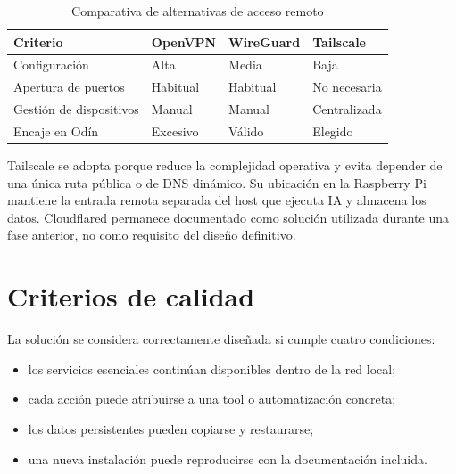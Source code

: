 \begin{table}[H]
  \centering
  \caption{Comparativa de alternativas de acceso remoto}
  \label{tab:vpn-comparativa}
  \begin{tabularx}{\textwidth}{lXXX}
    \toprule
    Criterio & OpenVPN & WireGuard & Tailscale \\
    \midrule
    Configuración & Alta & Media & Baja \\
    Apertura de puertos & Habitual & Habitual & No necesaria \\
    Gestión de dispositivos & Manual & Manual & Centralizada \\
    Encaje en Odín & Excesivo & Válido & Elegido \\
    \bottomrule
  \end{tabularx}
\end{table}

Tailscale se adopta porque reduce la complejidad operativa y evita depender de
una única ruta pública o de DNS dinámico. Su ubicación en la Raspberry Pi
mantiene la entrada remota separada del host que ejecuta IA y almacena los
datos. Cloudflared permanece documentado como solución utilizada durante una
fase anterior, no como requisito del diseño definitivo.

\section{Criterios de calidad}
La solución se considera correctamente diseñada si cumple cuatro condiciones:

\begin{itemize}
  \item los servicios esenciales continúan disponibles dentro de la red local;
  \item cada acción puede atribuirse a una tool o automatización concreta;
  \item los datos persistentes pueden copiarse y restaurarse;
  \item una nueva instalación puede reproducirse con la documentación incluida.
\end{itemize}
